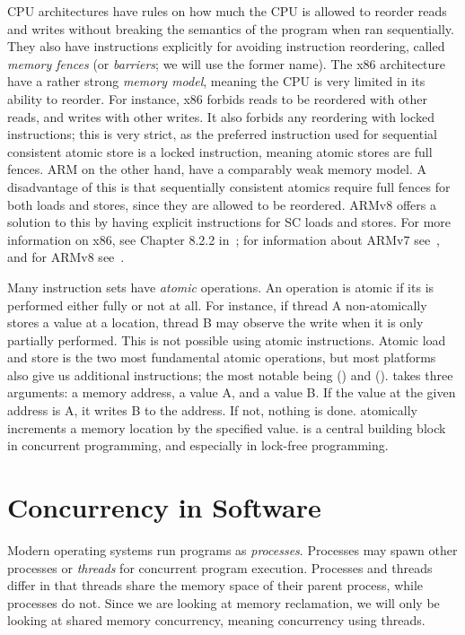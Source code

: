 \documentclass[b5paper]{report}
\begin{document}
CPU architectures have rules on how much the CPU is allowed to reorder reads and
writes without breaking the semantics of the program when ran sequentially. They
also have instructions explicitly for avoiding instruction reordering, called
\emph{memory fences} (or \emph{barriers}; we will use the former name). The x86
architecture have a rather strong \emph{memory model}, meaning the CPU is very
limited in its ability to reorder.  For instance, x86 forbids reads to be
reordered with other reads, and writes with other writes. It also forbids any
reordering with locked instructions; this is very strict, as the preferred
instruction used for sequential consistent atomic store is a locked instruction,
meaning atomic stores are full fences. ARM on the other hand, have a comparably
weak memory model. A disadvantage of this is that sequentially consistent
atomics require full fences for both loads and stores, since they are allowed to
be reordered. ARMv8 offers a solution to this by having explicit instructions
for SC loads and stores. For more information on x86, see Chapter 8.2.2
in~\cite{intel64}; for information about ARMv7 see~\cite{armv7-reference-manual},
and for ARMv8 see~\cite{armv8-reference-manual}.

Many instruction sets have \emph{atomic} operations. An operation is atomic if
its is performed either fully or not at all. For instance, if thread A
non-atomically stores a value at a location, thread B may observe the write when
it is only partially performed. This is not possible using atomic instructions.
Atomic load and store is the two most fundamental atomic operations, but most
platforms also give us additional instructions; the most notable being
 () and  ().
 takes three arguments: a memory address, a value A, and a value B. If
the value at the given address is A, it writes B to the address. If not, nothing
is done.  atomically increments a memory location by the specified
value.  is a central building block in concurrent programming, and
especially in lock-free programming.

\section{Concurrency in Software}

Modern operating systems run programs as \emph{processes}. Processes may spawn
other processes or \emph{threads} for concurrent program execution. Processes
and threads differ in that threads share the memory space of their parent
process, while processes do not. Since we are looking at memory reclamation, we
will only be looking at shared memory concurrency, meaning concurrency using
threads.
\end{document}
